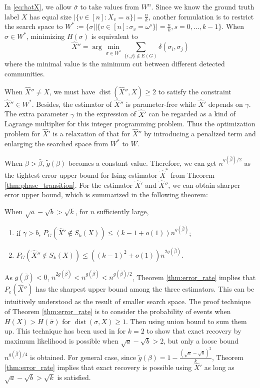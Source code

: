 \documentclass[entropy,article,submit,moreauthors,pdftex]{Definitions/mdpi}
\newcommand{\1}{\mathbbm{1}}
\DeclareMathOperator{\Dist}{dist}
\begin{document}
In \eqref{eq:hatX}, we allow $\bar{\sigma}$ to take values from $W^n$. Since we know the ground truth label $X$ has equal
size $|\{v \in [n] : X_v = u\}| = \frac{n}{k}$, another formulation is to restrict the search space to
$W^*:= \{\sigma \big\vert |\{v \in [n] : \sigma_v = \omega^s\}| = \frac{n}{k}, s=0,\dots, k-1 \}$.
When $\sigma \in W^*$, minimizing $H(\sigma)$ is equivalent to
\begin{equation}
\hat{X}'' = \arg\min_{\sigma \in W^*} \sum_{\{i,j\} \not\in E(G) } \delta(\sigma_i, \sigma_j)
\end{equation}
where the minimal value is the minimum cut between different detected communities.

When $\hat{X}'' \neq X$, we must have $\Dist(\hat{X}'' ,X)\geq 2$ to satisfy the constraint $\hat{X}'' \in W^*$.
Besides, the estimator of $\hat{X}''$ is parameter-free while $\hat{X}'$ depends on $\gamma$. The extra parameter $\gamma$ in the expression of
$\hat{X}'$ can be regarded as a kind of Lagrange multiplier for this integer programming problem. Thus the optimization problem for $\hat{X}'$
is a relaxation of that for $\hat{X}''$ by introducing a penalized term and enlarging the searched space from $W^*$ to $W$.

When $\beta > \bar{\beta}$, $\tilde{g}(\beta)$ becomes a constant value. Therefore, we can get $n^{g(\bar{\beta})/2}$ as the tightest error upper bound for Ising estimator $\hat{X}^*$ from Theorem \ref{thm:phase_transition}.
For the estimator $\hat{X}'$ and $\hat{X}''$, we can obtain sharper error upper bound, which is
summarized in the following theorem:
\begin{Theorem}\label{thm:error_rate}
When $\sqrt{a} - \sqrt{b} > \sqrt{k}$, for $n$ sufficiently large, 
\begin{enumerate}
	\item if $\gamma > b$, $P_G(\hat{X}' \not\in S_k(X)) \leq (k-1+o(1))n^{g(\bar{\beta})}$;
	\item $P_G(\hat{X}'' \not\in S_k(X)) \leq ((k-1)^2+o(1))n^{2g(\bar{\beta})}$.
\end{enumerate}
\end{Theorem}
As $g(\bar{\beta})<0$, $n^{2g(\bar{\beta})} < n^{g(\bar{\beta})} < n^{g(\bar{\beta})/2}$,
Theorem \ref{thm:error_rate} implies that $P_e(\hat{X}'')$ has the sharpest upper bound among the three estimators.
This can be intuitively understood as the result of smaller search space.
The proof technique of Theorem \ref{thm:error_rate} is to consider the probability of events when $H(X) > H(\bar{\sigma})$
for $\Dist(\sigma, X) \geq 1$. Then using union bound to sum them up.
This technique has been used in \cite{abbe2015exact} for $k=2$ to show that exact recovery by maximum likelihood is possible
when $\sqrt{a} - \sqrt{b} > 2$, but only a loose bound $n^{g(\bar{\beta})/4}$ is obtained.
For general case, since $\tilde{g}(\beta) = 1- \frac{(\sqrt{a} - \sqrt{b})^2}{k}$, Theorem \ref{thm:error_rate} implies that exact recovery is possible using $\hat{X}'$ as long as  
$\sqrt{a} - \sqrt{b} > \sqrt{k}$ is satisfied.
\end{document}

